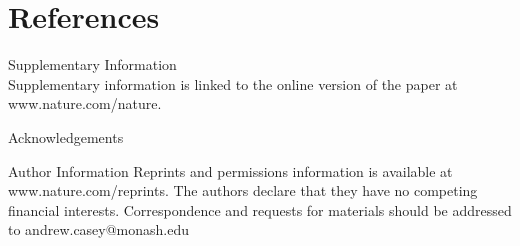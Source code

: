 \documentclass{nature}
\newcommand{\todo}[1]{\textcolor{blue}{#1}}
\begin{document}


\section*{References}

\begin{thebibliography}{30}
\end{thebibliography}




\begin{addendum}
\item[Supplementary Information] ~\\Supplementary information is linked to the online version of the paper at www.nature.com/nature.
\item[Acknowledgements] %
 \item[Author Information] Reprints and permissions information is
   available at www.nature.com/reprints. The authors declare that they
   have no competing financial interests. Correspondence and requests
   for materials should be addressed to andrew.casey@monash.edu
\end{addendum}
\end{document}
